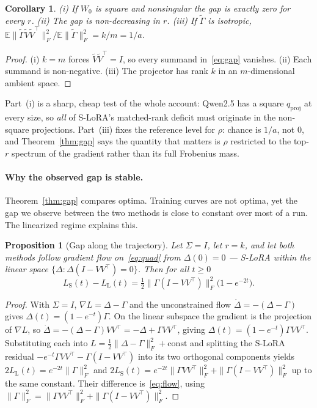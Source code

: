 \documentclass{article}
\newtheorem{proposition}[theorem]{Proposition}
\newtheorem{corollary}[theorem]{Corollary}
\theoremstyle{remark}
\begin{document}
\begin{corollary}\label{cor:gap}
(i) If $W_0$ is square and nonsingular the gap is exactly zero for every $r$.
(ii) The gap is non-decreasing in $r$.
(iii) If $\widetilde\Gamma$ is isotropic, $\mathbb{E}\|\widetilde\Gamma
\widetilde V\widetilde V^{\top}\|_F^2/\mathbb{E}\|\widetilde\Gamma\|_F^2=k/m=1/a$.
\end{corollary}

\begin{proof}
(i) $k=m$ forces $\widetilde V\widetilde V^{\top}=I$, so every summand
in~\eqref{eq:gap} vanishes. (ii) Each summand is non-negative. (iii) The
projector has rank $k$ in an $m$-dimensional ambient space.
\end{proof}

Part~(i) is a sharp, cheap test of the whole account: Qwen2.5 has a square
$q_{\mathrm{proj}}$ at every size, so \emph{all} of S-LoRA's matched-rank
deficit must originate in the non-square projections. Part~(iii) fixes the
reference level for $\rho$: chance is $1/a$, not $0$, and
Theorem~\ref{thm:gap} says the quantity that matters is $\rho$ restricted to
the top-$r$ spectrum of the gradient rather than its full Frobenius mass.

\paragraph{Why the observed gap is stable.}
Theorem~\ref{thm:gap} compares optima. Training curves are not optima, yet the
gap we observe between the two methods is close to constant over most of a run.
The linearized regime explains this.

\begin{proposition}[Gap along the trajectory]\label{prop:flow}
Let $\Sigma=I$, let $r=k$, and let both methods follow gradient flow
on~\eqref{eq:quad} from $\Delta(0)=0$ --- S-LoRA within the linear space
$\{\Delta:\Delta(I-VV^{\top})=0\}$. Then for all $t\ge0$
\begin{equation}
  L_{\mathrm{S}}(t)-L_{\mathrm{L}}(t)=\tfrac12\bigl\|\Gamma(I-VV^{\top})\bigr\|_F^2\bigl(1-e^{-2t}\bigr).
  \label{eq:flow}
\end{equation}
\end{proposition}

\begin{proof}
With $\Sigma=I$, $\nabla L=\Delta-\Gamma$ and the unconstrained flow
$\dot\Delta=-(\Delta-\Gamma)$ gives $\Delta(t)=(1-e^{-t})\Gamma$. On the linear
subspace the gradient is the projection of $\nabla L$, so
$\dot\Delta=-(\Delta-\Gamma)VV^{\top}=-\Delta+\Gamma VV^{\top}$, giving
$\Delta(t)=(1-e^{-t})\Gamma VV^{\top}$. Substituting each into
$L=\tfrac12\|\Delta-\Gamma\|_F^2+\mathrm{const}$ and splitting the S-LoRA
residual $-e^{-t}\Gamma VV^{\top}-\Gamma(I-VV^{\top})$ into its two orthogonal
components yields
$2L_{\mathrm{L}}(t)=e^{-2t}\|\Gamma\|_F^2$ and
$2L_{\mathrm{S}}(t)=e^{-2t}\|\Gamma VV^{\top}\|_F^2+\|\Gamma(I-VV^{\top})\|_F^2$
up to the same constant. Their difference is~\eqref{eq:flow}, using
$\|\Gamma\|_F^2=\|\Gamma VV^{\top}\|_F^2+\|\Gamma(I-VV^{\top})\|_F^2$.
\end{proof}
\end{document}
